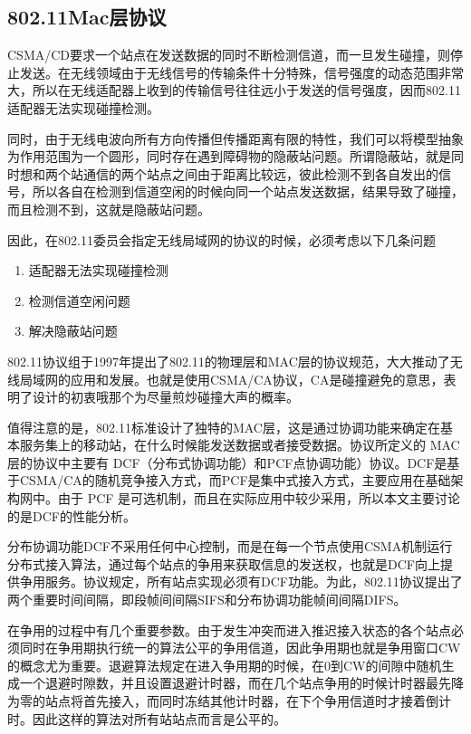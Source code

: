 \documentclass{article}
\begin{document}
\subsection{802.11Mac层协议}

CSMA/CD要求一个站点在发送数据的同时不断检测信道，而一旦发生碰撞，则停止发送。在无线领域由于无线信号的传输条件十分特殊，信号强度的动态范围非常大，所以在无线适配器上收到的传输信号往往远小于发送的信号强度，因而802.11适配器无法实现碰撞检测。

同时，由于无线电波向所有方向传播但传播距离有限的特性，我们可以将模型抽象为作用范围为一个圆形，同时存在遇到障碍物的隐蔽站问题。所谓隐蔽站，就是同时想和两个站通信的两个站点之间由于距离比较远，彼此检测不到各自发出的信号，所以各自在检测到信道空闲的时候向同一个站点发送数据，结果导致了碰撞，而且检测不到，这就是隐蔽站问题。

因此，在802.11委员会指定无线局域网的协议的时候，必须考虑以下几条问题

\begin{enumerate}
	
	\item {适配器无法实现碰撞检测}
	\item {检测信道空闲问题}
	\item {解决隐蔽站问题}
	
\end{enumerate}

802.11协议组于1997年提出了802.11的物理层和MAC层的协议规范，大大推动了无线局域网的应用和发展。也就是使用CSMA/CA协议，CA是碰撞避免的意思，表明了设计的初衷哦那个为尽量煎炒碰撞大声的概率。

值得注意的是，802.11标准设计了独特的MAC层，这是通过协调功能来确定在基本服务集上的移动站，在什么时候能发送数据或者接受数据。协议所定义的 MAC 层的协议中主要有 DCF（分布式协调功能）和PCF点协调功能）协议。DCF是基于CSMA/CA的随机竞争接入方式，而PCF是集中式接入方式，主要应用在基础架构网中。由于 PCF 是可选机制，而且在实际应用中较少采用，所以本文主要讨论的是DCF的性能分析。

分布协调功能DCF不采用任何中心控制，而是在每一个节点使用CSMA机制运行分布式接入算法，通过每个站点的争用来获取信息的发送权，也就是DCF向上提供争用服务。协议规定，所有站点实现必须有DCF功能。为此，802.11协议提出了两个重要时间间隔，即段帧间间隔SIFS和分布协调功能帧间间隔DIFS。

在争用的过程中有几个重要参数。由于发生冲突而进入推迟接入状态的各个站点必须同时在争用期执行统一的算法公平的争用信道，因此争用期也就是争用窗口CW的概念尤为重要。退避算法规定在进入争用期的时候，在0到CW的间隙中随机生成一个退避时隙数，并且设置退避计时器，而在几个站点争用的时候计时器最先降为零的站点将首先接入，而同时冻结其他计时器，在下个争用信道时才接着倒计时。因此这样的算法对所有站站点而言是公平的。
\end{document}

